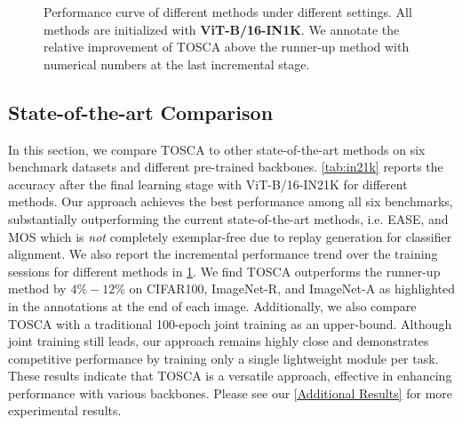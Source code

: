\begin{figure}[h]
\captionsetup{font=small}
\caption{Performance curve of different methods under different settings. All methods are initialized with \textbf{ViT-B/16-IN1K}. We annotate the relative improvement of TOSCA above the runner-up method with numerical numbers at the last incremental stage.}
\label{fig:in1k}
\vskip -0.2cm
\end{figure}



\subsection{State-of-the-art Comparison}
In this section, we compare TOSCA to other state-of-the-art methods on six benchmark datasets and different pre-trained backbones. \cref{tab:in21k} reports the accuracy after the final learning stage with ViT-B/16-IN21K for different methods. Our approach achieves the best performance among all six benchmarks, substantially outperforming the current state-of-the-art methods, i.e. EASE, and MOS which is \textit{not} completely exemplar-free due to replay generation for classifier alignment.
We also report the incremental performance trend over the training sessions for different methods in \cref{fig:in1k}. We find TOSCA outperforms the runner-up method by $4\% - 12\%$ on CIFAR100, ImageNet-R, and ImageNet-A as highlighted in the annotations at the end of each image. 
Additionally, we also compare TOSCA with a traditional 100-epoch joint training as an upper-bound. Although joint training still leads, our approach remains highly close and demonstrates competitive performance by training only a single lightweight module per task. 
These results indicate that TOSCA is a versatile approach, effective in enhancing performance with various backbones. Please see our \cref{Additional Results} for more experimental results.

